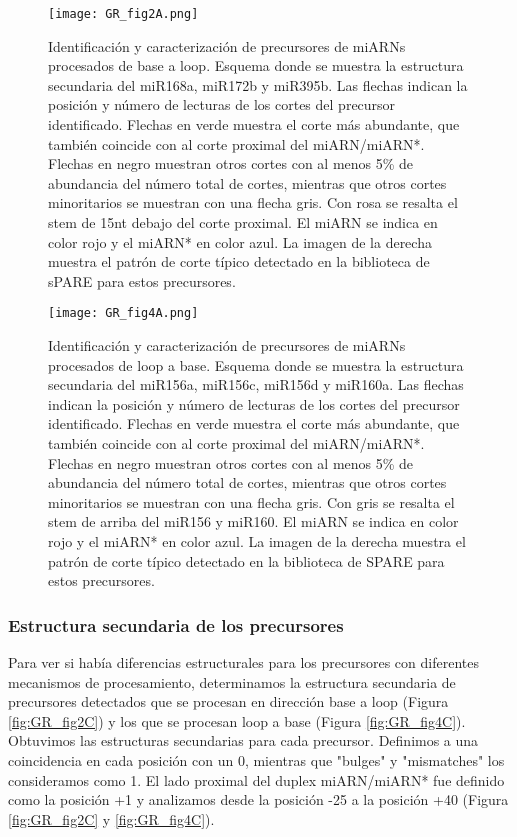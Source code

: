 \begin{figure}[htbp!] 
    \centering    
    \texttt{[image: GR\_fig2A.png]}
    \caption[Identificación y caracterización de precursores de miARNs procesados de base a loop]{Identificación y caracterización de precursores de miARNs procesados de base a loop.
            Esquema donde se muestra la estructura secundaria del miR168a, miR172b y miR395b.
            Las flechas indican la posición y número de lecturas de los cortes del precursor identificado.
            Flechas en verde muestra el corte más abundante, que también coincide con al corte proximal del miARN/miARN*.
            Flechas en negro muestran otros cortes con al menos 5\% de abundancia del número total de cortes, mientras que otros cortes minoritarios se muestran con una flecha gris.
            Con rosa se resalta el stem de 15nt debajo del corte proximal.
            El miARN se indica en color rojo y el miARN* en color azul.
            La imagen de la derecha muestra el patrón de corte típico detectado en la biblioteca de sPARE para estos precursores.}
    \label{fig:GR_fig2A}
\end{figure}


\begin{figure}[htbp!] 
    \centering    
    \texttt{[image: GR\_fig4A.png]}
    \caption[Identificación y caracterización de precursores de miARNs procesados de loop a base]{Identificación y caracterización de precursores de miARNs procesados de loop a base. 
    Esquema donde se muestra la estructura secundaria del miR156a, miR156c, miR156d y miR160a.
    Las flechas indican la posición y número de lecturas de los cortes del precursor identificado.
    Flechas en verde muestra el corte más abundante, que también coincide con al corte proximal del miARN/miARN*.
    Flechas en negro muestran otros cortes con al menos 5\% de abundancia del número total de cortes, mientras que otros cortes minoritarios se muestran con una flecha gris.
    Con gris se resalta el stem de arriba del miR156 y miR160. El miARN se indica en color rojo y el miARN* en color azul.
    La imagen de la derecha muestra el patrón de corte típico detectado en la biblioteca de SPARE para estos precursores.
}
    \label{fig:GR_fig4A}
\end{figure}

\subsubsection{Estructura secundaria de los precursores}
Para ver si había diferencias estructurales para los precursores con diferentes mecanismos de procesamiento, determinamos la estructura secundaria de precursores detectados que se procesan en dirección base a loop (Figura \ref{fig:GR_fig2C}) y los que se procesan loop a base (Figura \ref{fig:GR_fig4C}).
Obtuvimos las estructuras secundarias para cada precursor.
Definimos a una coincidencia en cada posición con un 0, mientras que "bulges" y "mismatches" los consideramos como 1.
El lado proximal del duplex miARN/miARN* fue definido como la posición +1 y analizamos desde la posición -25 a la posición +40 (Figura \ref{fig:GR_fig2C} y \ref{fig:GR_fig4C}). 

